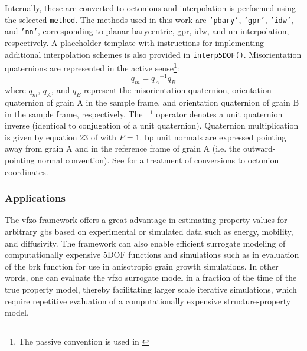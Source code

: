\documentclass[final,twocolumn,12pt]{elsarticle}
\begin{document}
Internally, these are converted to octonions and interpolation is performed using the selected \texttt{method}. The methods used in this work are \texttt{'pbary'}, \texttt{'gpr'}, \texttt{'idw'}, and \texttt{'nn'}, corresponding to planar barycentric, \gls{gpr}, \gls{idw}, and \gls{nn} interpolation, respectively. A placeholder template with instructions for implementing additional interpolation schemes is also provided in \texttt{interp5DOF()}. Misorientation quaternions are represented in the active sense\footnote{The passive convention is used in \cite{francisGeodesicOctonionMetric2019}}:
\begin{equation}
    q_m = {q_A}^{-1}q_B
\end{equation}
where $q_m$, $q_A$, and $q_B$ represent the misorientation quaternion, orientation quaternion of grain A in the sample frame, and orientation quaternion of grain B in the sample frame, respectively. The $^{-1}$ operator denotes a unit quaternion inverse (identical to conjugation of a unit quaternion). Quaternion multiplication is given by equation 23 of \cite{rowenhorstConsistentRepresentationsConversions2015} with $P=1$. \Gls{bp} unit normals are expressed pointing away from grain A and in the reference frame of grain A (i.e. the outward-pointing normal convention). See \cite{francisGeodesicOctonionMetric2019} for a treatment of conversions to octonion coordinates.

\subsubsection{Applications}

The \gls{vfzo} framework offers a great advantage in estimating property values for arbitrary \glspl{gb} based on experimental or simulated data such as energy, mobility, and diffusivity. The framework can also enable efficient surrogate modeling of computationally expensive 5DOF functions and simulations such as in evaluation of the \gls{brk} function \cite{bulatovGrainBoundaryEnergy2014} for use in anisotropic grain growth simulations. In other words, one can evaluate the \gls{vfzo} surrogate model in a fraction of the time of the true property model, thereby facilitating larger scale iterative simulations, which require repetitive evaluation of a computationally expensive structure-property model.

\end{document}
